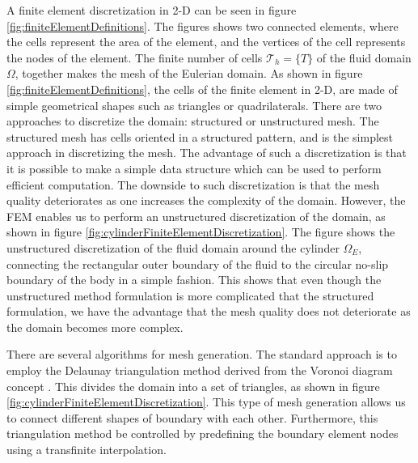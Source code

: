 A finite element discretization in 2-D can be seen in figure \ref{fig:finiteElementDefinitions}. The figures shows two connected elements, where the cells represent the area of the element, and the vertices of the cell represents the nodes of the element. The finite number of cells $\mathcal{T}_h = \{T\}$ of the fluid domain $\Omega$, together makes the mesh of the Eulerian domain. As shown in figure \ref{fig:finiteElementDefinitions}, the cells of the finite element in 2-D, are made of simple geometrical shapes such as triangles or quadrilaterals. There are two approaches to discretize the domain: structured or unstructured mesh. The structured mesh has cells oriented in a structured pattern, and is the simplest approach in discretizing the mesh. The advantage of such a discretization is that it is possible to make a simple data structure which can be used to perform efficient computation. The downside to such discretization is that the mesh quality deteriorates as one increases the complexity of the domain. However, the FEM enables us to perform an unstructured discretization of the domain, as shown in figure \ref{fig:cylinderFiniteElementDiscretization}. The figure shows the unstructured discretization of the fluid domain around the cylinder $\Omega_E$, connecting the rectangular outer boundary of the fluid to the circular no-slip boundary of the body in a simple fashion. This shows that even though the unstructured method formulation is more complicated that the structured formulation, we have the advantage that the mesh quality does not deteriorate as the domain becomes more complex.

There are several algorithms for mesh generation. The standard approach is to employ the Delaunay triangulation method derived from the Voronoi diagram concept \cite{Carey1997}. This divides the domain into a set of triangles, as shown in figure \ref{fig:cylinderFiniteElementDiscretization}. This type of mesh generation allows us to connect different shapes of boundary with each other. Furthermore, this triangulation method be controlled by predefining the boundary element nodes using a transfinite interpolation.

